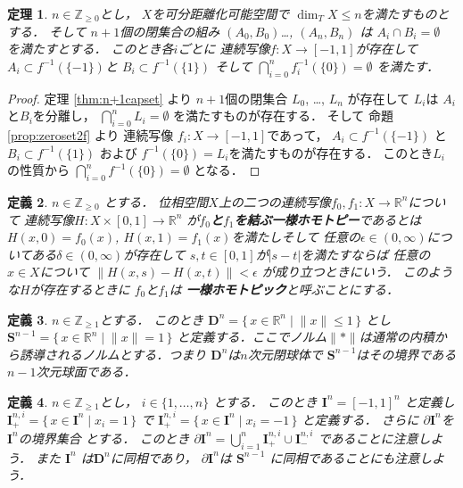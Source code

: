 \documentclass[leqno, a4paper, 12pt]{jsarticle}
\newtheorem{thm}{定理}
\newtheorem{df}[thm]{定義}
\newcommand{\zz}{\mathbb{Z}}
\newcommand{\rr}{\mathbb{R}}
\newcommand{\mydisc}[1]{\mathbf{D}^{#1}}
\newcommand{\mysphere}[1]{\mathbf{S}^{#1}}
\newcommand{\mycube}[1]{\mathbf{I}^{n}}
\newcommand{\mycubesidep}[2]{\mathbf{I}^{#1, #2}_{+}}
\newcommand{\mycubesidem}[2]{\mathbf{I}^{#1, #2}_{-}}
\newcommand{\mycubebd}[1]{\partial\mathbf{I}^{#1}}
\numberwithin{equation}{section}
\begin{document}
\begin{thm}\label{thm:n+1funczero}
$n\in \zz_{\ge 0}$とし，
$X$を可分距離化可能空間で
$\dim_{T}X\le n$を満たすものとする．
そして
$n+1$個の閉集合の組み
$(A_{0}, B_{0})$\dots, 
$(A_{n}, B_{n})$
は
$A_{i}\cap B_{i}=\emptyset$
を満たすとする．
このとき各$i$ごとに
連続写像$f\colon X\to [-1, 1]$が存在して
$A_{i}\subset f^{-1}(\{-1\})$と
$B_{i}\subset f^{-1}(\{1\})$
そして
$\bigcap_{i=0}^{n}f_{i}^{-1}(\{0\})=\emptyset$
を満たす．
\end{thm}
\begin{proof}
定理
\ref{thm:n+1capset}
より
$n+1$個の閉集合
$L_{0}$, 
\dots, 
$L_{n}$
が存在して
$L_{i}$は
$A_{i}$と$B_{i}$を分離し，
$\bigcap_{i=0}^{n}L_{i}=\emptyset$
を満たすものが存在する．
そして
命題 
\ref{prop:zeroset2f}
より
連続写像
$f_{i}\colon X\to [-1, 1]$であって，
$A_{i}\subset f^{-1}(\{-1\})$
と
$B_{i}\subset f^{-1}(\{1\})$
および
$f^{-1}(\{0\})=L_{i}$を満たすものが存在する．
このとき$L_{i}$の性質から
$\bigcap_{i=0}^{n}f^{-1}(\{0\})=\emptyset$
となる．
\end{proof}

\begin{df}
$n\in \zz_{\ge 0}$
とする．
位相空間$X$上の二つの連続写像$f_{0}, f_{1}\colon X\to \rr^{n}$について
連続写像$H\colon X\times [0, 1]\to \rr^{n}$
が\textbf{$f_{0}$と$f_{1}$を結ぶ一様ホモトピー}であるとは
$H(x, 0)=f_{0}(x)$, $H(x, 1)=f_{1}(x)$を満たしそして
任意の$\epsilon\in (0, \infty)$についてある$\delta\in (0, \infty)$が存在して
$s, t\in [0, 1]$が$|s-t|$を満たすならば
任意の$x\in X$について
$\lVert H(x, s)-H(x, t)\rVert<\epsilon$
が成り立つときにいう．
このような$H$が存在するときに
$f_{0}$と$f_{1}$は
\textbf{一様ホモトピック}と呼ぶことにする．
\end{df}


\begin{df}
$n\in \zz_{\ge 1}$とする．
このとき
$\mydisc{n}=\{\, x\in \rr^{n}\mid \lVert x \rVert\le 1\, \}$
とし
$\mysphere{n-1}=\{\, x\in \rr^{n}\mid \lVert x \rVert=1\, \}$
と定義する．ここでノルム$\lVert *\rVert$は通常の内積から誘導されるノルムとする．つまり
$\mydisc{n}$は$n$次元閉球体で
$\mysphere{n-1}$はその境界である$n-1$次元球面である．
\end{df}

\begin{df}
$n\in \zz_{\ge 1}$とし，
$i\in \{1, \dots, n\}$
とする．
このとき
$\mycube{n}=[-1, 1]^{n}$
と定義し
$\mycubesidep{n}{i}=\{\, x\in \mycube{n}\mid x_{i}=1\, \}$
で
$\mycubesidep{n}{i}=\{\, x\in \mycube{n}\mid x_{i}=-1\, \}$
と定義する．
さらに
$\mycubebd{n}$を$\mycube{n}$の境界集合
とする．
このとき
$\mycubebd{n}=\bigcup_{i=1}^{n}\mycubesidep{n}{i}\cup \mycubesidem{n}{i}$
であることに注意しよう．
また
$\mycube{n}$
は$\mydisc{n}$に同相であり，
$\mycubebd{n}$は
$\mysphere{n-1}$
に同相であることにも注意しよう．
\end{df}
\end{document}
